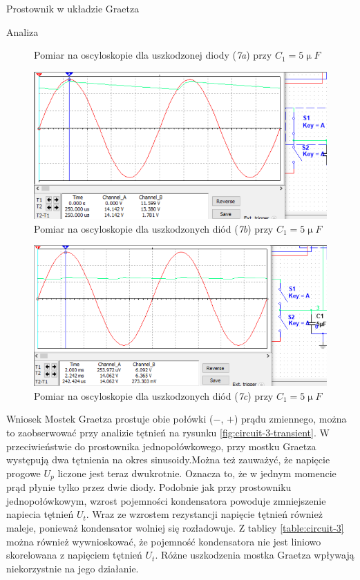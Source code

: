 \documentclass[a4paper]{scrartcl}
\begin{document}
\begin{section}{Prostownik w układzie Graetza}
\begin{subsection}{Analiza}
\begin{figure}[!ht]
\begin{center}
					\caption{Pomiar na oscyloskopie dla uszkodzonej diody (\textit{7a}) przy $C_{1} = 5\upmu F$}
				\end{center}
				\end{figure}
				\begin{figure}[!ht]
				\begin{center}
					\includegraphics[width=0.7\linewidth,scale=2]{exercise-3-diode-fail-2}
					\caption{Pomiar na oscyloskopie dla uszkodzonych diód (\textit{7b}) przy $C_{1} = 5\upmu F$}
				\end{center}
				\end{figure}
				\begin{figure}[!ht]
				\begin{center}
					\includegraphics[width=0.7\linewidth,scale=2]{exercise-3-diode-fail-3}
					\caption{Pomiar na oscyloskopie dla uszkodzonych diód (\textit{7c}) przy $C_{1} = 5\upmu F$}
				\end{center}
				\end{figure}

		\end{subsection}
		\pagebreak
		\begin{subsection}{Wniosek}
			Mostek Graetza prostuje obie połówki ($-$, $+$) prądu zmiennego, można to zaobserwować przy analizie tętnień na rysunku \ref{fig:circuit-3-transient}. W przeciwieństwie do prostownika jednopołówkowego, przy mostku Graetza występują dwa tętnienia na okres sinusoidy.Można też zauważyć, że napięcie progowe $U_{p} $ liczone jest teraz dwukrotnie. Oznacza to, że w jednym momencie prąd płynie tylko przez dwie diody. Podobnie jak przy prostowniku jednopołówkowym, wzrost pojemności kondensatora powoduje zmniejszenie napiecia tętnień $U_{t}$. Wraz ze wzrostem rezystancji napięcie tętnień również maleje, ponieważ kondensator wolniej się rozładowuje. Z tablicy \ref{table:circuit-3} można również wywnioskować, że pojemność kondensatora nie jest liniowo skorelowana z napięciem tętnień $U_{t}$. Różne uszkodzenia mostka Graetza wpływają niekorzystnie na jego działanie.
		\end{subsection}
	\end{section}
\end{document}
